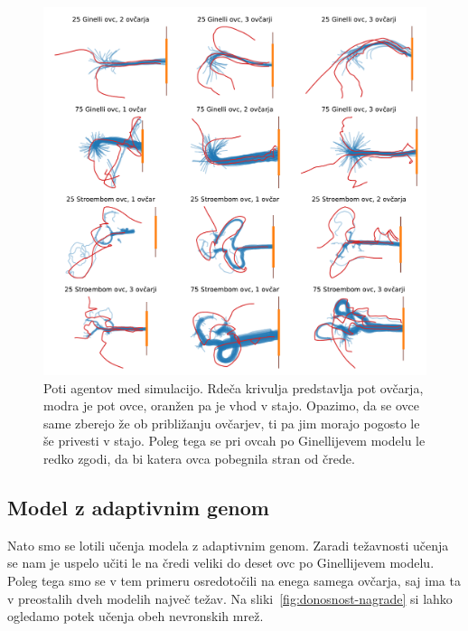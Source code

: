 \begin{figure}[H]  %
	\centering
	\includegraphics[width=\textwidth]{../poglavja/grafi/lokacijeAI1.pdf}
	\caption[Poti agentov med simulacijo]{Poti agentov med simulacijo. Rdeča krivulja predstavlja pot ovčarja, modra je pot ovce, oranžen pa je vhod v stajo. Opazimo, da se ovce same zberejo že ob približanju ovčarjev, ti pa jim morajo pogosto le še privesti v stajo. Poleg tega se pri ovcah po Ginellijevem modelu le redko zgodi, da bi katera ovca pobegnila stran od črede.} %
	\label{fig:lokacije}
\end{figure}

\subsection{Model z adaptivnim genom}

Nato smo se lotili učenja modela z adaptivnim genom. Zaradi težavnosti učenja se nam je uspelo učiti le na čredi veliki do deset ovc po Ginellijevem modelu. Poleg tega smo se v tem primeru osredotočili na enega samega ovčarja, saj ima ta v preostalih dveh modelih največ težav. Na sliki~\ref{fig:donosnost-nagrade} si lahko ogledamo potek učenja obeh nevronskih mrež.


